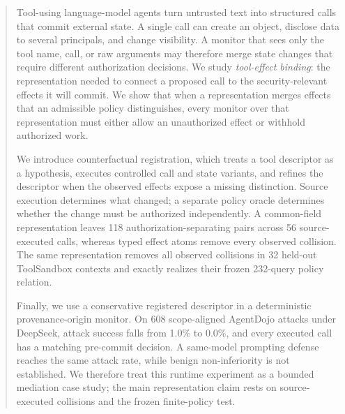 \begin{abstract}
Tool-using language-model agents turn untrusted text into structured calls that
commit external state.  A single call can create an object, disclose data to
several principals, and change visibility.  A monitor that sees only the tool
name, call, or raw arguments may therefore merge state changes that require
different authorization decisions.  We study \emph{tool-effect binding}: the
representation needed to connect a proposed call to the security-relevant
effects it will commit.  We show that when a representation merges effects
that an admissible policy distinguishes, every monitor over that representation
must either allow an unauthorized effect or withhold authorized work.

We introduce counterfactual registration, which treats a tool descriptor as a
hypothesis, executes controlled call and state variants, and refines the
descriptor when the observed effects expose a missing distinction.  Source
execution determines what changed; a separate policy oracle determines whether
the change must be authorized independently.  A common-field representation
leaves 118 authorization-separating pairs across 56 source-executed calls,
whereas typed effect atoms remove every observed collision.  The same
representation removes all observed collisions in 32 held-out ToolSandbox
contexts and exactly realizes their frozen 232-query policy relation.

Finally, we use a conservative registered descriptor in a deterministic
provenance-origin monitor.  On 608 scope-aligned AgentDojo attacks under
DeepSeek, attack success falls from 1.0\% to 0.0\%, and every executed call has
a matching pre-commit decision.  A same-model prompting defense reaches the
same attack rate, while benign non-inferiority is not established.  We
therefore treat this runtime experiment as a bounded mediation case study; the
main representation claim rests on source-executed collisions and the frozen
finite-policy test.
\end{abstract}
